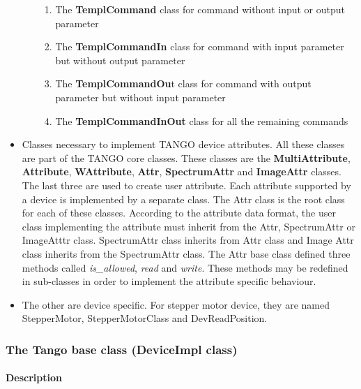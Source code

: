 \begin{itemize}
\begin{enumerate}
\begin{enumerate}
\item The \textbf{TemplCommand} class for command without
input or output parameter
\item The \textbf{TemplCommandIn} class for command
with input parameter but without output parameter
\item The \textbf{TemplCommandOu}t class for command
with output parameter but without input parameter
\item The \textbf{TemplCommandInOut} class for
all the remaining commands
\end{enumerate}
\end{enumerate}
\item Classes necessary to implement TANGO device attributes.
All these classes are part of the TANGO core classes. These classes
are the \textbf{MultiAttribute}, \textbf{Attribute},
\textbf{WAttribute}, \textbf{Attr},
\textbf{SpectrumAttr} and \textbf{ImageAttr}
classes. The last three are used to create user attribute. Each attribute
supported by a device is implemented by a separate class. The Attr
class is the root class for each of these classes. According to the
attribute data format, the user class implementing the attribute must
inherit from the Attr, SpectrumAttr or ImageAtttr class. SpectrumAttr
class inherits from Attr class and Image Attr class inherits from
the SpectrumAttr class. The Attr base class defined three methods
called \emph{is\_allowed}, \emph{read}
and \emph{write}. These methods may be redefined in
sub-classes in order to implement the attribute specific behaviour.
\item The other are device specific. For stepper motor device, they are
named StepperMotor, StepperMotorClass and DevReadPosition.
\end{itemize}

\subsubsection{The Tango base class (DeviceImpl class)}


\paragraph{Description}

